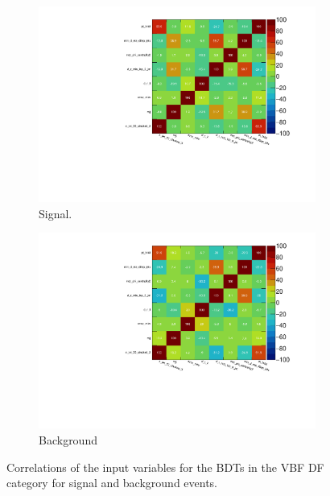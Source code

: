 \begin{figure}[htb]
    \centering
    \begin{subfigure}[t]{0.7\textwidth}
        \includegraphics[width=\textwidth]{./plots/mva/variable_reduction/VBF_DF_CorrelationMatrixS.pdf}
        \caption{Signal.}
    \end{subfigure}
    \begin{subfigure}[t]{0.7\textwidth}
        \includegraphics[width=\textwidth]{./plots/mva/variable_reduction/VBF_DF_CorrelationMatrixB.pdf}
        \caption{Background}
    \end{subfigure}
    \caption{Correlations of the input variables for the BDTs in the VBF DF category for signal and background events.}\label{fig:mva:variables:correlationsb:vbfdf}
\end{figure}

